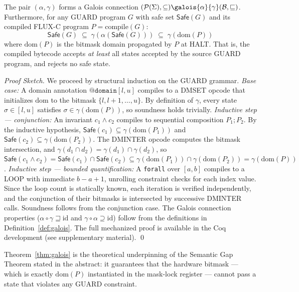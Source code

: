 \documentclass[sigplan,review,anonymous]{acmart}
\begin{document}
\begin{theorem}
\label{thm:galois}
The pair $(\alpha, \gamma)$ forms a Galois connection
$(\mathcal{P}(\Sigma), \subseteq) \galois{\alpha}{\gamma} (\mathcal{B}, \sqsubseteq)$.
Furthermore, for any GUARD program $G$ with safe set $\mathsf{Safe}(G)$
and its compiled FLUX-C program $P = \mathrm{compile}(G)$:
\[
  \mathsf{Safe}(G) \;\subseteq\; \gamma(\alpha(\mathsf{Safe}(G)))
  \;\subseteq\; \gamma(\mathrm{dom}(P))
\]
where $\mathrm{dom}(P)$ is the bitmask domain propagated by $P$ at HALT.
That is, the compiled bytecode accepts \emph{at least} all states accepted
by the source GUARD program, and rejects no safe state.
\end{theorem}

\begin{proof}[Proof Sketch]
We proceed by structural induction on the GUARD grammar.
\emph{Base case:} A domain annotation $\texttt{@domain}[l, u]$ compiles
to a DMSET opcode that initializes $\mathrm{dom}$ to the bitmask
$\{l, l+1, \ldots, u\}$.
By definition of $\gamma$, every state $\sigma \in [l, u]$ satisfies
$\sigma \in \gamma(\mathrm{dom}(P))$, so soundness holds trivially.
\emph{Inductive step — conjunction:} An invariant $c_1 \wedge c_2$
compiles to sequential composition $P_1; P_2$.
By the inductive hypothesis, $\mathsf{Safe}(c_1) \subseteq \gamma(\mathrm{dom}(P_1))$
and $\mathsf{Safe}(c_2) \subseteq \gamma(\mathrm{dom}(P_2))$.
The DMINTER opcode computes the bitmask intersection, and
$\gamma(d_1 \cap d_2) = \gamma(d_1) \cap \gamma(d_2)$,
so $\mathsf{Safe}(c_1 \wedge c_2) = \mathsf{Safe}(c_1) \cap \mathsf{Safe}(c_2)
\subseteq \gamma(\mathrm{dom}(P_1)) \cap \gamma(\mathrm{dom}(P_2))
= \gamma(\mathrm{dom}(P))$.
\emph{Inductive step — bounded quantification:} A \texttt{forall} over $[a, b]$
compiles to a LOOP with immediate $b - a + 1$, unrolling constraint checks
for each index value. Since the loop count is statically known, each
iteration is verified independently, and the conjunction of their bitmasks
is intersected by successive DMINTER calls. Soundness follows from the
conjunction case.
The Galois connection properties ($\alpha \circ \gamma \sqsupseteq \mathrm{id}$
and $\gamma \circ \alpha \supseteq \mathrm{id}$) follow from the definitions
in Definition~\ref{def:galois}.
The full mechanized proof is available in the Coq development
(see supplementary material). \qed
\end{proof}

\noindent
Theorem~\ref{thm:galois} is the theoretical underpinning of the
Semantic Gap Theorem stated in the abstract: it guarantees that
the hardware bitmask — which is exactly $\mathrm{dom}(P)$ instantiated
in the mask-lock register — cannot pass a state that violates any GUARD
constraint.
\end{document}
